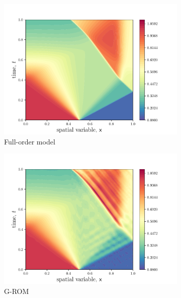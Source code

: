 \begin{figure}
\begin{center}
\begin{subfigure}[t]{0.48\textwidth}
\includegraphics[width=1.\linewidth]{figs/sod/xt_fom.pdf}
\caption{Full-order model}
\end{subfigure}
\begin{subfigure}[t]{0.48\textwidth}
\includegraphics[width=1.\linewidth]{figs/sod/xt_grom.pdf}
\caption{G-ROM}
\end{subfigure}
\begin{subfigure}[t]{0.48\textwidth}

\end{subfigure}
\end{center}
\end{figure}

